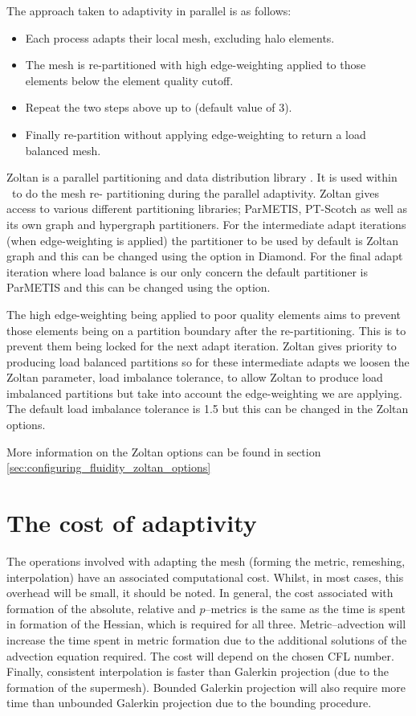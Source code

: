 The approach taken to adaptivity in parallel is as follows:

\begin{itemize}
\item Each process adapts their local mesh, excluding halo elements.
\item The mesh is re-partitioned with high edge-weighting applied to those
elements below the element quality cutoff.
\item Repeat the two steps above up to  (default value of $3$).
\item Finally re-partition without applying edge-weighting to return a
load balanced mesh.
\end{itemize} 

Zoltan is a parallel partitioning and data distribution library 
\citep{devine2002}. It is used within \fluidity\ to do the mesh re-
partitioning during the parallel adaptivity. Zoltan gives access to
various different partitioning libraries; ParMETIS, PT-Scotch as well as 
its own graph and hypergraph partitioners. For the intermediate adapt iterations
(when edge-weighting is applied) the partitioner to be used by default
is Zoltan graph and this can be changed using the  option
in Diamond. For the final adapt iteration where load balance is our
only concern the default partitioner is ParMETIS and this can be
changed using the  option.

The high edge-weighting being applied to poor quality elements aims to
prevent those elements being on a partition boundary after the
re-partitioning. This is to prevent them being locked for the next
adapt iteration. Zoltan gives priority to producing load balanced
partitions so for these intermediate adapts we loosen the Zoltan
parameter, load imbalance tolerance, to allow Zoltan to produce load
imbalanced partitions but take into account the edge-weighting we are
applying. The default load imbalance tolerance is 1.5 but this can be
changed in the Zoltan options.

More information on the Zoltan options can be found in section \ref{sec:configuring_fluidity_zoltan_options}

\section{The cost of adaptivity}

The operations involved with adapting the mesh (forming the metric, remeshing, interpolation) have an associated computational cost. Whilst, in most cases, this overhead will be small, it should be noted. In general, the cost associated with formation of the absolute, relative and $p$--metrics is the same as the time is spent in formation of the Hessian, which is required for all three. Metric--advection will increase the time spent in metric formation due to the additional solutions of the advection equation required. The cost will depend on the chosen CFL number. Finally, consistent interpolation is faster than Galerkin projection (due to the formation of the supermesh). Bounded Galerkin projection will also require more time than unbounded Galerkin projection due to the bounding procedure.

